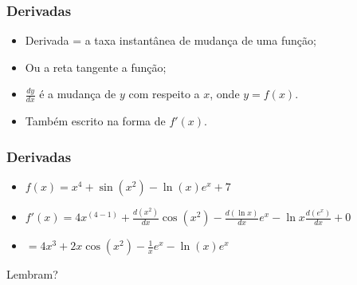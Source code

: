 \begin{frame}
\frametitle{Derivadas}

  \begin{itemize}[<+-| alert@+>]
    \item Derivada = a taxa instantânea de mudança de uma função;
    \item Ou a reta tangente a função;
    \item $\frac{dy}{dx}$ é a mudança de $y$ com respeito a $x$, onde
          $y = f(x)$.
    \item Também escrito na forma de $f'(x)$.
  \end{itemize}

\end{frame}


\begin{frame}
\frametitle{Derivadas}

  \begin{itemize}[<+-| alert@+>]
    \item $f(x) = x^4 + \sin(x^2) - \ln(x)e^x + 7$
    \item $f'(x) = 4x^{(4-1)} + \frac{d(x^2)}{dx}\cos(x^2) -
          \frac{d(\ln x)}{dx}e^x - \ln x\frac{d(e^x)}{dx}+ 0$
    \item $= 4x^3 + 2x\cos(x^2) - \frac{1}{x}e^x - \ln(x)e^x$
  \end{itemize}

  \pause Lembram?

\end{frame}


